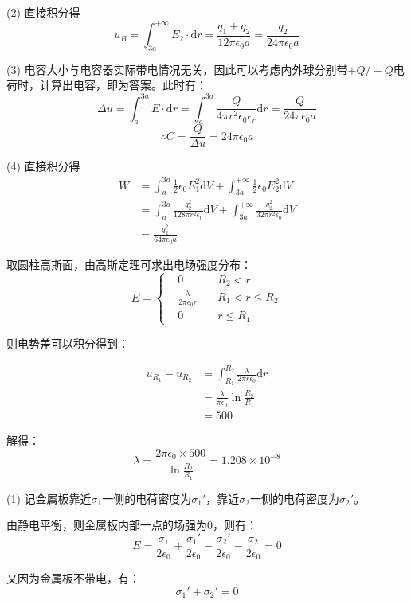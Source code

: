 \documentclass[b5paper,opensource,sourcefont,parskip]{qyxf-book}
\newcommand{\di}[1]{\mathrm{d}#1}
\begin{document}
(2)
直接积分得
\[u_B=\int_{3a}^{+\infty}E_2\cdot \di{r}=\frac{q_1+q_2}{12\pi\epsilon_0a}=\frac{q_2}{24\pi\epsilon_0a}\]

(3)
电容大小与电容器实际带电情况无关，因此可以考虑内外球分别带$ +Q/-Q $电荷时，计算出电容，即为答案。此时有：
\[\Delta u=\int_a^{3a}E\cdot \di{r}=\int_a^{3a}\frac{Q}{4\pi r^2\epsilon_0\epsilon_r}\di{r}=\frac{Q}{24\pi\epsilon_0a}\]
\[\therefore C=\frac{Q}{\Delta u}=24\pi\epsilon_0a\]

(4)
直接积分得
\begin{align*}
W&=\int_a^{3a}\frac{1}{2}\epsilon_0 E_1^2\di{V}+\int_{3a}^{+\infty}\frac{1}{2}\epsilon_0 E_2^2\di{V}\\
&=\int_a^{3a}\frac{q_2^2}{128\pi r^2\epsilon_0} \di{V}+\int_{3a}^{+\infty}\frac{q_2^2}{32\pi r^2\epsilon_0}\di{V}\\
&=\frac{q_2^2}{64\pi\epsilon_0a}
\end{align*}


\solve 取圆柱高斯面，由高斯定理可求出电场强度分布：
\begin{equation}
E=\left\{
\begin{aligned}
&0\quad &R_2<r\\
&\frac{\lambda}{2\pi\epsilon_0 r}\quad &R_1<r\leqslant R_2\\
&0	&r\leqslant R_1
\end{aligned}
\right.
\end{equation}

则电势差可以积分得到：

\begin{align*}
u_{R_1}-u_{R_2}&=\int_{R_1}^{R_2} \frac{\lambda}{2\pi r\epsilon_0} \di{r}\\
&=\frac{\lambda}{\pi\epsilon_0}\ln\frac{R_2}{R_1}\\
&=500
\end{align*}


解得：
\[\lambda=\frac{2\pi\epsilon_0\times 500}{\ln\frac{R_2}{R_1}}=1.208\times 10^{-8}\]


\solve 
(1) 记金属板靠近$ \sigma_1 $一侧的电荷密度为$ \sigma_1' $，靠近$ \sigma_2 $一侧的电荷密度为$ \sigma_2' $。

由静电平衡，则金属板内部一点的场强为$ 0 $，则有：
\[E=\frac{\sigma_1}{2\epsilon_0}+\frac{\sigma_1'}{2\epsilon_0}-\frac{\sigma_2'}{2\epsilon_0}-\frac{\sigma_2}{2\epsilon_0}=0\]

又因为金属板不带电，有：
\[\sigma_1'+\sigma_2'=0\]
\end{document}
